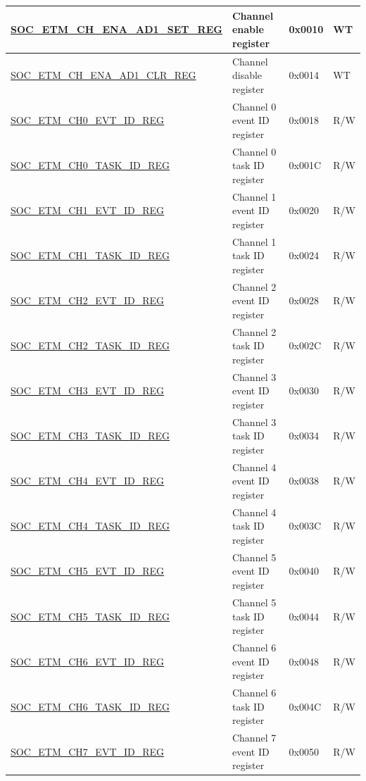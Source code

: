 \begin{longtable}{ | p{6cm} | p{6.2cm} | p{1.3cm} | p{2cm} | }
\hyperref[regdesc:SOCETMCHENAAD1SETREG]{SOC\_ETM\_CH\_ENA\_AD1\_SET\_REG} & Channel enable register & 0x0010 & WT \\ \hline
\hyperref[regdesc:SOCETMCHENAAD1CLRREG]{SOC\_ETM\_CH\_ENA\_AD1\_CLR\_REG} & Channel disable register & 0x0014 & WT \\ \hline
\hyperref[regdesc:SOCETMCHNEVTIDREG]{SOC\_ETM\_CH0\_EVT\_ID\_REG} & Channel 0 event ID register & 0x0018 & R/W \\ \hline
\hyperref[regdesc:SOCETMCHNTASKIDREG]{SOC\_ETM\_CH0\_TASK\_ID\_REG} & Channel 0 task ID register & 0x001C & R/W \\ \hline
\hyperref[regdesc:SOCETMCHNEVTIDREG]{SOC\_ETM\_CH1\_EVT\_ID\_REG} & Channel 1 event ID register & 0x0020 & R/W \\ \hline
\hyperref[regdesc:SOCETMCHNTASKIDREG]{SOC\_ETM\_CH1\_TASK\_ID\_REG} & Channel 1 task ID register & 0x0024 & R/W \\ \hline
\hyperref[regdesc:SOCETMCHNEVTIDREG]{SOC\_ETM\_CH2\_EVT\_ID\_REG} & Channel 2 event ID register & 0x0028 & R/W \\ \hline
\hyperref[regdesc:SOCETMCHNTASKIDREG]{SOC\_ETM\_CH2\_TASK\_ID\_REG} & Channel 2 task ID register & 0x002C & R/W \\ \hline
\hyperref[regdesc:SOCETMCHNEVTIDREG]{SOC\_ETM\_CH3\_EVT\_ID\_REG} & Channel 3 event ID register & 0x0030 & R/W \\ \hline
\hyperref[regdesc:SOCETMCHNTASKIDREG]{SOC\_ETM\_CH3\_TASK\_ID\_REG} & Channel 3 task ID register & 0x0034 & R/W \\ \hline
\hyperref[regdesc:SOCETMCHNEVTIDREG]{SOC\_ETM\_CH4\_EVT\_ID\_REG} & Channel 4 event ID register & 0x0038 & R/W \\ \hline
\hyperref[regdesc:SOCETMCHNTASKIDREG]{SOC\_ETM\_CH4\_TASK\_ID\_REG} & Channel 4 task ID register & 0x003C & R/W \\ \hline
\hyperref[regdesc:SOCETMCHNEVTIDREG]{SOC\_ETM\_CH5\_EVT\_ID\_REG} & Channel 5 event ID register & 0x0040 & R/W \\ \hline
\hyperref[regdesc:SOCETMCHNTASKIDREG]{SOC\_ETM\_CH5\_TASK\_ID\_REG} & Channel 5 task ID register & 0x0044 & R/W \\ \hline
\hyperref[regdesc:SOCETMCHNEVTIDREG]{SOC\_ETM\_CH6\_EVT\_ID\_REG} & Channel 6 event ID register & 0x0048 & R/W \\ \hline
\hyperref[regdesc:SOCETMCHNTASKIDREG]{SOC\_ETM\_CH6\_TASK\_ID\_REG} & Channel 6 task ID register & 0x004C & R/W \\ \hline
\hyperref[regdesc:SOCETMCHNEVTIDREG]{SOC\_ETM\_CH7\_EVT\_ID\_REG} & Channel 7 event ID register & 0x0050 & R/W \\ \hline

\end{longtable}
